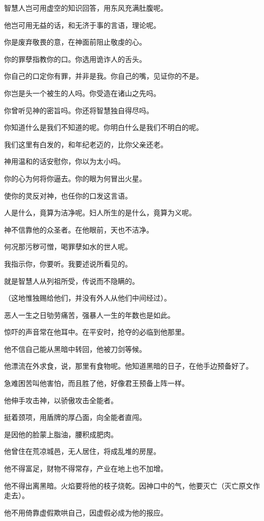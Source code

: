 \documentclass[12pt,oneside]{book}
\begin{document}
智慧人岂可用虚空的知识回答，用东风充满肚腹呢。

他岂可用无益的话，和无济于事的言语，理论呢。

你是废弃敬畏的意，在神面前阻止敬虔的心。

你的罪孽指教你的口。你选用诡诈人的舌头。

你自己的口定你有罪，并非是我。你自己的嘴，见证你的不是。

你岂是头一个被生的人吗。你受造在诸山之先吗。

你曾听见神的密旨吗。你还将智慧独自得尽吗。

你知道什么是我们不知道的呢。你明白什么是我们不明白的呢。

我们这里有白发的，和年纪老迈的，比你父亲还老。

神用温和的话安慰你，你以为太小吗。

你的心为何将你逼去。你的眼为何冒出火星。

使你的灵反对神，也任你的口发这言语。

人是什么，竟算为洁净呢。妇人所生的是什么，竟算为义呢。

神不信靠他的众圣者。在他眼前，天也不洁净。

何况那污秽可憎，喝罪孽如水的世人呢。

我指示你，你要听。我要述说所看见的。

就是智慧人从列祖所受，传说而不隐瞒的。

（这地惟独赐给他们，并没有外人从他们中间经过）。

恶人一生之日劬劳痛苦，强暴人一生的年数也是如此。

惊吓的声音常在他耳中。在平安时，抢夺的必临到他那里。

他不信自己能从黑暗中转回，他被刀剑等候。

他漂流在外求食，说，那里有食物呢。他知道黑暗的日子，在他手边预备好了。

急难困苦叫他害怕，而且胜了他，好像君王预备上阵一样。

他伸手攻击神，以骄傲攻击全能者。

挺着颈项，用盾牌的厚凸面，向全能者直闯。

是因他的脸蒙上脂油，腰积成肥肉。

他曾住在荒凉城邑，无人居住，将成乱堆的房屋。

他不得富足，财物不得常存，产业在地上也不加增。

他不得出离黑暗。火焰要将他的枝子烧乾。因神口中的气，他要灭亡（灭亡原文作走去）。

他不用倚靠虚假欺哄自己，因虚假必成为他的报应。
\end{document}
